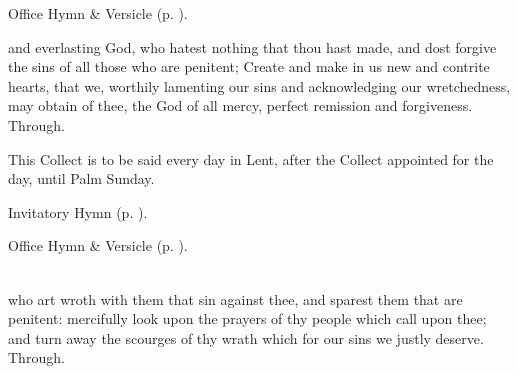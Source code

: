
\secondEvensong


\begin{rubric}
	Office Hymn \& Versicle  (p. \pageref{WednesdayEvensong}).
\end{rubric}



\collect\label{AshWednesdayMassCollect}
 and everlasting God, who hatest nothing that thou hast made, and dost forgive the sins of all those who are penitent; Create and make in us new and contrite hearts, that we, worthily lamenting our sins and acknowledging our wretchedness, may obtain of thee, the God of all mercy, perfect remission and forgiveness. Through.

\begin{rubric}
This Collect is to be said every day in Lent, after the Collect appointed for the day, until Palm Sunday.
\end{rubric}


\clearpage
{}


\mattins

\begin{rubric}
	Invitatory Hymn  (p. \pageref{ThursdayInvitatory}).
\end{rubric}


\begin{rubric}
	Office Hymn \& Versicle  (p. \pageref{ThursdayMattins}).
\end{rubric}

\\

{} who art wroth with them that sin against thee, and sparest them that are penitent: mercifully look upon the prayers of thy people which call upon thee; and turn away the scourges of thy wrath which for our sins we justly deserve. Through.

